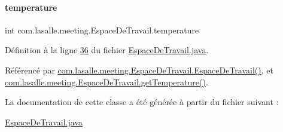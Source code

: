 \paragraph{\texorpdfstring{temperature}{temperature}}
{\footnotesize\ttfamily int com.\+lasalle.\+meeting.\+Espace\+De\+Travail.\+temperature\hspace{0.3cm}{\ttfamily [private]}}



Définition à la ligne \hyperlink{_espace_de_travail_8java_source_l00036}{36} du fichier \hyperlink{_espace_de_travail_8java_source}{Espace\+De\+Travail.\+java}.



Référencé par \hyperlink{_espace_de_travail_8java_source_l00070}{com.\+lasalle.\+meeting.\+Espace\+De\+Travail.\+Espace\+De\+Travail()}, et \hyperlink{_espace_de_travail_8java_source_l00107}{com.\+lasalle.\+meeting.\+Espace\+De\+Travail.\+get\+Temperature()}.



La documentation de cette classe a été générée à partir du fichier suivant \+:\begin{DoxyCompactItemize}
\item 
\hyperlink{_espace_de_travail_8java}{Espace\+De\+Travail.\+java}\end{DoxyCompactItemize}
